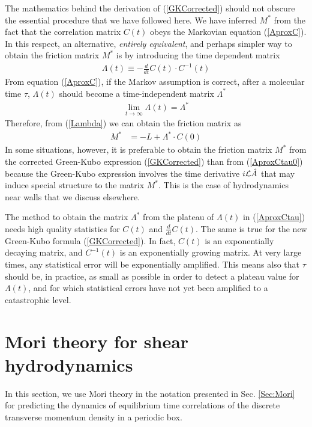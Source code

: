 \documentclass[b5paper,openright,10pt]{book}
\newcommand{\esc}{\!\cdot\!}
\begin{document}
The mathematics  behind the  derivation of  (\ref{GKCorrected}) should
not obscure  the essential  procedure that we  have followed  here. We
have inferred $M^*$  from the fact that the  correlation matrix $C(t)$
obeys  the Markovian  equation  (\ref{AproxC}).  In  this respect,  an
alternative, \textit{entirely equivalent}, and  perhaps simpler way to
obtain the friction matrix $M^*$  is by introducing the time dependent
matrix
\begin{align}
\Lambda(t)\equiv-    \frac{d}{dt}C(t)\esc C^{-1}(t)
\label{AproxCtau}
\end{align}
From equation (\ref{AproxC}),  if the Markov assumption is  correct, after a
molecular  time   $\tau$,  $\Lambda(t)$  should   become  a
time-independent matrix  $\Lambda^*$
\begin{align}
  \lim_{t\to \infty}\Lambda(t)=\Lambda^*
\label{toLambda*}
\end{align}
Therefore, from (\ref{Lambda}) we can obtain the friction matrix as
\begin{align}
M^*&=  -L+ \Lambda^*\esc C(0)
\label{AproxCtau0}
\end{align}
In some situations,  however, it is preferable to  obtain the friction
matrix    $M^*$    from    the   corrected    Green-Kubo    expression
(\ref{GKCorrected})   than   from   (\ref{AproxCtau0})   because   the
Green-Kubo expression involves the  time derivative $i{\cal L}\hat{A}$
that may  induce special structure to  the matrix $M^*$.  This  is the
case of hydrodynamics near walls that we discuss elsewhere.

The  method to  obtain  the  matrix $\Lambda^*$  from  the plateau  of
$\Lambda(t)$ in  (\ref{AproxCtau}) needs  high quality  statistics for
$C(t)$  and  $\frac{d}{dt}C(t)$.   The  same   is  true  for  the  new
Green-Kubo  formula (\ref{GKCorrected}).   In  fact,  ${C}(t)$ is  an
exponentially  decaying matrix,  and $C^{-1}(t)$  is an  exponentially
growing matrix.   At very large  times, any statistical error  will be
exponentially amplified.  This  means also that $\tau$  should be, in
practice, as small as possible in  order to detect a plateau value for
$\Lambda(t)$,  and for  which  statistical errors  have  not yet  been
amplified to a  catastrophic level.  


\section{Mori theory for shear hydrodynamics}
\label{Sec:MoriPBC}
In this section, we use Mori theory in the notation presented in Sec. \ref{Sec:Mori} for predicting the dynamics of equilibrium time correlations of the discrete transverse momentum density in a periodic box. 
\end{document}

